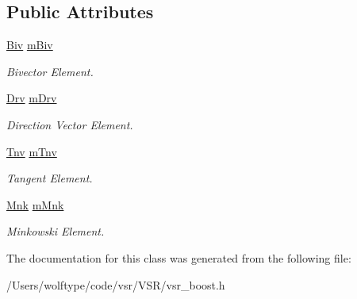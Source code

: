 \subsection*{Public Attributes}
\begin{DoxyCompactItemize}
\item 
\hypertarget{classvsr_1_1_boost_ab127160865defb8f48facbe312fb3a08}{\hyperlink{namespacevsr_ab2f5aee828c6c805b8a86a5b077d192c}{Biv} \hyperlink{classvsr_1_1_boost_ab127160865defb8f48facbe312fb3a08}{m\-Biv}}\label{classvsr_1_1_boost_ab127160865defb8f48facbe312fb3a08}

\begin{DoxyCompactList}\small\item\em Bivector Element. \end{DoxyCompactList}\item 
\hypertarget{classvsr_1_1_boost_ad87b8d8bd91131919247d6ccd2b393a4}{\hyperlink{namespacevsr_a106201b887e3d76e1fa4e2b719f1c9cc}{Drv} \hyperlink{classvsr_1_1_boost_ad87b8d8bd91131919247d6ccd2b393a4}{m\-Drv}}\label{classvsr_1_1_boost_ad87b8d8bd91131919247d6ccd2b393a4}

\begin{DoxyCompactList}\small\item\em Direction Vector Element. \end{DoxyCompactList}\item 
\hypertarget{classvsr_1_1_boost_aecb921e9c5041e75642c236fb19a9236}{\hyperlink{namespacevsr_a042664cb2545c7ef14aeb5e5e5d092de}{Tnv} \hyperlink{classvsr_1_1_boost_aecb921e9c5041e75642c236fb19a9236}{m\-Tnv}}\label{classvsr_1_1_boost_aecb921e9c5041e75642c236fb19a9236}

\begin{DoxyCompactList}\small\item\em Tangent Element. \end{DoxyCompactList}\item 
\hypertarget{classvsr_1_1_boost_a77de5daee76a1b0455df83af2c3539bb}{\hyperlink{namespacevsr_ace9d2714a493810090e61420d6a688c6}{Mnk} \hyperlink{classvsr_1_1_boost_a77de5daee76a1b0455df83af2c3539bb}{m\-Mnk}}\label{classvsr_1_1_boost_a77de5daee76a1b0455df83af2c3539bb}

\begin{DoxyCompactList}\small\item\em Minkowski Element. \end{DoxyCompactList}\end{DoxyCompactItemize}


The documentation for this class was generated from the following file\-:\begin{DoxyCompactItemize}
\item 
/\-Users/wolftype/code/vsr/\-V\-S\-R/vsr\-\_\-boost.\-h\end{DoxyCompactItemize}
